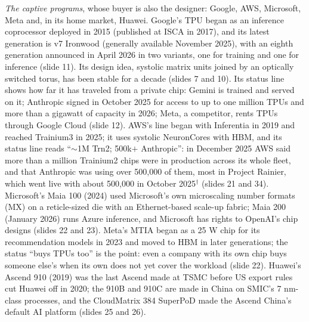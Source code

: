 \documentclass[11pt,letterpaper]{article}
\begin{document}
\emph{The captive programs}, whose buyer is also the designer: Google, AWS, Microsoft, Meta and, in its home market, Huawei. Google's TPU began as an inference coprocessor deployed in 2015 (published at ISCA in 2017), and its latest generation is v7 Ironwood (generally available November 2025), with an eighth generation announced in April 2026 in two variants, one for training and one for inference (slide 11). Its design idea, systolic matrix units joined by an optically switched torus, has been stable for a decade (slides 7 and 10). Its status line shows how far it has traveled from a private chip: Gemini is trained and served on it; Anthropic signed in October 2025 for access to up to one million TPUs and more than a gigawatt of capacity in 2026; Meta, a competitor, rents TPUs through Google Cloud (slide 12). AWS's line began with Inferentia in 2019 and reached Trainium3 in 2025; it uses systolic NeuronCores with HBM, and its status line reads ``${\sim}$1M Trn2; 500k$+$ Anthropic'': in December 2025 AWS said more than a million Trainium2 chips were in production across its whole fleet, and that Anthropic was using over 500{,}000 of them, most in Project Rainier, which went live with about 500{,}000 in October 2025$^\dagger$ (slides 21 and 34). Microsoft's Maia 100 (2024) used Microsoft's own microscaling number formats (MX) on a reticle-sized die with an Ethernet-based scale-up fabric; Maia 200 (January 2026) runs Azure inference, and Microsoft has rights to OpenAI's chip designs (slides 22 and 23). Meta's MTIA began as a 25 W chip for its recommendation models in 2023 and moved to HBM in later generations; the status ``buys TPUs too'' is the point: even a company with its own chip buys someone else's when its own does not yet cover the workload (slide 22). Huawei's Ascend 910 (2019) was the last Ascend made at TSMC before US export rules cut Huawei off in 2020; the 910B and 910C are made in China on SMIC's 7 nm-class processes, and the CloudMatrix 384 SuperPoD made the Ascend China's default AI platform (slides 25 and 26).
\end{document}
